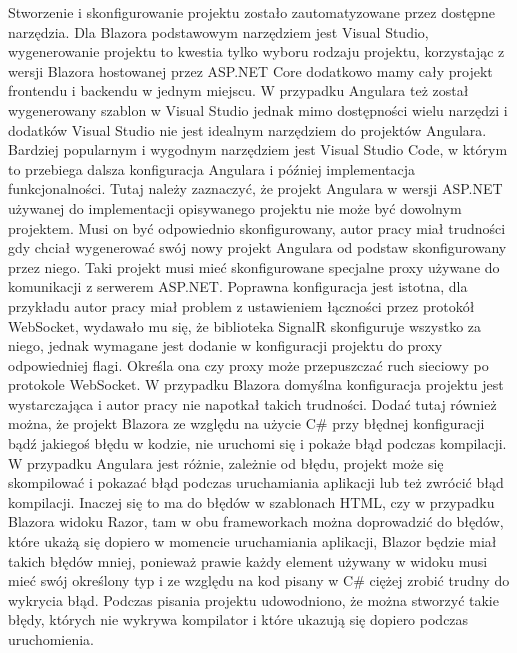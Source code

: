 \documentclass[12pt,a4paper,oneside]{book}
\begin{document}
Stworzenie i skonfigurowanie projektu zostało zautomatyzowane przez dostępne narzędzia. Dla Blazora podstawowym narzędziem jest Visual Studio, wygenerowanie projektu to kwestia tylko wyboru rodzaju projektu, korzystając z wersji Blazora hostowanej przez ASP.NET Core dodatkowo mamy cały projekt frontendu i backendu w jednym miejscu. W przypadku Angulara też został wygenerowany szablon w Visual Studio jednak mimo dostępności wielu narzędzi i dodatków Visual Studio nie jest idealnym narzędziem do projektów Angulara. Bardziej popularnym i wygodnym narzędziem jest Visual Studio Code, w którym to przebiega dalsza konfiguracja Angulara i później implementacja funkcjonalności. Tutaj należy zaznaczyć, że projekt Angulara w wersji ASP.NET używanej do implementacji opisywanego projektu nie może być dowolnym projektem. Musi on być odpowiednio skonfigurowany, autor pracy miał trudności gdy chciał wygenerować swój nowy projekt Angulara od podstaw skonfigurowany przez niego. Taki projekt musi mieć skonfigurowane specjalne proxy używane do komunikacji z serwerem ASP.NET. Poprawna konfiguracja jest istotna, dla przykładu autor pracy miał problem z ustawieniem łączności przez protokół WebSocket, wydawało mu się, że biblioteka SignalR skonfiguruje wszystko za niego, jednak wymagane jest dodanie w konfiguracji projektu do proxy odpowiedniej flagi. Określa ona czy proxy może przepuszczać ruch sieciowy po protokole WebSocket. W przypadku Blazora domyślna konfiguracja projektu jest wystarczająca i autor pracy nie napotkał takich trudności. Dodać tutaj również można, że projekt Blazora ze względu na użycie C\# przy błędnej konfiguracji bądź jakiegoś błędu w kodzie, nie uruchomi się i pokaże błąd podczas kompilacji. W przypadku Angulara jest różnie, zależnie od błędu, projekt może się skompilować i pokazać błąd podczas uruchamiania aplikacji lub też zwrócić błąd kompilacji. Inaczej się to ma do błędów w szablonach HTML, czy w przypadku Blazora widoku Razor, tam w obu frameworkach można doprowadzić do błędów, które ukażą się dopiero w momencie uruchamiania aplikacji, Blazor będzie miał takich błędów mniej, ponieważ prawie każdy element używany w widoku musi mieć swój określony typ i ze względu na kod pisany w C\# ciężej zrobić trudny do wykrycia błąd. Podczas pisania projektu udowodniono, że można stworzyć takie błędy, których nie wykrywa kompilator i które ukazują się dopiero podczas uruchomienia.
\end{document}
